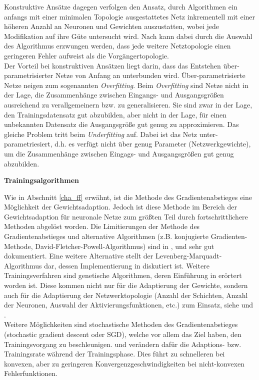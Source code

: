 Konstruktive Ansätze dagegen verfolgen den Ansatz, durch Algorithmen ein anfangs mit einer minimalen Topologie ausgestattetes Netz inkrementell mit einer höheren Anzahl an Neuronen und Gewichten auszustatten, wobei jede Modifikation auf ihre Güte untersucht wird. Nach \cite{Parekh.2000} kann dabei durch die Auswahl des Algorithmus erzwungen werden, dass jede weitere Netztopologie einen geringeren Fehler aufweist als die Vorgängertopologie. \\
Der Vorteil bei konstruktiven Ansätzen liegt darin, dass das Entstehen über-parametrisierter Netze von Anfang an unterbunden wird. Über-parametrisierte Netze neigen zum sogenannten \textit{Overfitting}. Beim \textit{Overfitting} sind Netze nicht in der Lage, die Zusammenhänge zwischen Eingangs- und Ausgangsgrößen ausreichend zu verallgemeinern bzw. zu generalisieren. Sie sind zwar in der Lage, den Trainingsdatensatz gut abzubilden, aber nicht in der Lage, für einen unbekannten Datensatz die Ausgangsgröße gut genug zu approximieren. Das gleiche Problem tritt beim \textit{Underfitting} auf. Dabei ist das Netz unter-parametriesiert, d.h. es verfügt nicht über genug Parameter (Netzwerkgewichte), um die Zusammenhänge zwischen Eingags- und Ausgangsgrößen gut genug abzubilden.


\textbf{Trainingsalgorithmen}

Wie in Abschnitt \ref{cha_ff} erwähnt, ist die Methode des Gradientenabstieges eine Möglichkeit der Gewichtsadaption. Jedoch ist diese Methode im Bereich der Gewichtsadaption für neuronale Netze zum größten Teil durch fortschrittlichere Methoden abgelöst worden. Die Limitierungen der Methode des Gradientenabstieges und alternative Algorithmen (z.B. konjugierte Gradienten-Methode, David-Fletcher-Powell-Algorithmus) sind in \cite{WarrenS.Sarle.1994}, \cite{Masters.1995} und \cite{Bishop.2010} sehr gut dokumentiert. Eine weitere Alternative stellt der Levenberg-Marquadt-Algorithmus dar, dessen Implementierung in \cite{Kollias.March1993} diskutiert ist. Weitere Trainingsverfahren sind genetische Algorithmen, deren Einführung in \cite{Hassoun.1996} erörtert worden ist. Diese kommen nicht nur für die Adaptierung der Gewichte, sondern auch für die Adaptierung der Netzwerktopologie (Anzahl der Schichten, Anzahl der Neuronen, Auswahl der Aktivierungsfunktionen, etc.) zum Einsatz, siehe \cite{Bayer.2009} und \cite{StevenA.Harp.1992}.  \\
Weitere Möglichkeiten sind stochastische Methoden des Gradientenabstieges (stochastic gradient descent oder SGD), welche vor allem das Ziel haben, den Trainingsvorgang zu beschleunigen. \cite{JohnDuchi.2010} und \cite{Zeiler.12222012} verändern dafür die Adaptions- bzw. Trainingsrate während der Trainingsphase. Dies führt zu schnelleren bei konvexen, aber zu geringeren Konvergenzgeschwindigkeiten bei nicht-konvexen Fehlerfunktionen. 

